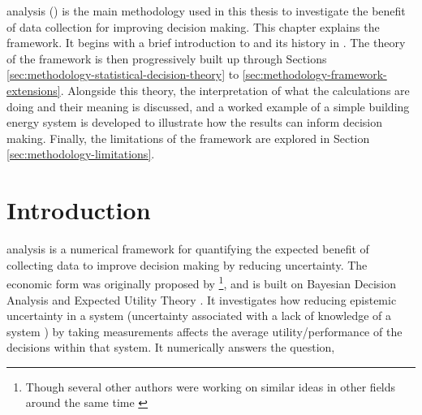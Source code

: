 



\begin{cbox}[colback=black!5!white]{}

\end{cbox}

\vfill

\noindent
{} analysis () is the main methodology used in this thesis to investigate the benefit of data collection for improving decision making. This chapter explains the  framework. It begins with a brief introduction to  and its history in . The theory of the framework is then progressively built up through Sections \ref{sec:methodology-statistical-decision-theory} to \ref{sec:methodology-framework-extensions}. Alongside this theory, the interpretation of what the calculations are doing and their meaning is discussed, and a worked example of a simple building energy system is developed to illustrate how the results can inform decision making. Finally, the limitations of the framework are explored in Section \ref{sec:methodology-limitations}. %

\newpage
\section{Introduction} \label{sec:methodology-intro}


 analysis is a numerical framework for quantifying the expected benefit of collecting data to improve decision making by reducing uncertainty. The economic form was originally proposed by \citep{raiffa1961AppliedStatisticalDecision}\footnote{Though several other authors were working on similar ideas in other fields around the same time \citep{howard1966InformationValueTheory,hurley1964MathematicalTheoryValue,spivey1968DecisionMakingProbabilistic,feltham1968ValueInformation,szaniawski1967ValuePerfectInformation}}, and is built on Bayesian Decision Analysis and Expected Utility Theory \citep{smith1945TheoryGamesEconomic}. It investigates how reducing epistemic uncertainty in a system (uncertainty associated with a lack of knowledge of a system \citep{zhang2021ValueInformationAnalysis}) by taking measurements affects the average utility/performance of the decisions within that system. It numerically answers the question,

